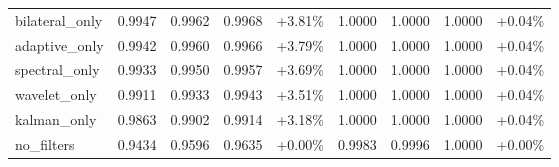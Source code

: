 \begin{table}[htbp]
\begin{adjustbox}{max width=\textwidth}
\begin{tabular}{l cccc cccc}
bilateral\_only & 0.9947 & 0.9962 & 0.9968 & +3.81\% & 1.0000 & 1.0000 & 1.0000 & +0.04\% \\
adaptive\_only & 0.9942 & 0.9960 & 0.9966 & +3.79\% & 1.0000 & 1.0000 & 1.0000 & +0.04\% \\
spectral\_only & 0.9933 & 0.9950 & 0.9957 & +3.69\% & 1.0000 & 1.0000 & 1.0000 & +0.04\% \\
wavelet\_only & 0.9911 & 0.9933 & 0.9943 & +3.51\% & 1.0000 & 1.0000 & 1.0000 & +0.04\% \\
kalman\_only & 0.9863 & 0.9902 & 0.9914 & +3.18\% & 1.0000 & 1.0000 & 1.0000 & +0.04\% \\
no\_filters & 0.9434 & 0.9596 & 0.9635 & +0.00\% & 0.9983 & 0.9996 & 1.0000 & +0.00\% \\
\bottomrule
\end{tabular}
\end{adjustbox}
\end{table}